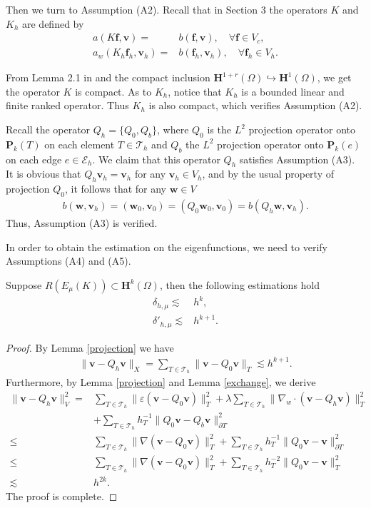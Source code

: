 \documentclass[leqno,CJK]{siamltex704}
\numberwithin{equation}{section}
\def\E{{\mathcal{E}}}
\def\T{{\mathcal{T}}}
\def\sumT{\sum_{T\in\mathcal{T}_h}}     %
\def\bw{{\mathbf{w}}}
\def\bv{{\mathbf{v}}}
\def\bh{{\mathbf{H}}}
\def\bf{{\mathbf{f}}}
\def\bP{{\mathbf{P}}}
\newcommand{\eps}{\varepsilon}
\begin{document}
Then we turn to Assumption (A2). Recall that in Section 3 the operators
$K$ and $K_h$ are defined by
\begin{align*}
	a(K\bf,\bv)=& b(\bf,\bv),\quad\forall\bf\in V_c,
	\\
	a_w(K_h\bf_h,\bv_h)=& b(\bf_h,\bv_h),\quad\forall \bf_h\in V_h.
\end{align*}

From Lemma 2.1 in \cite{Mora2020} and the compact inclusion $\bh^{1+r}(\Omega)\hookrightarrow\bh^1(\Omega)$, we get the operator $K$ is compact. As to $K_h$, notice that $K_h$ is a bounded linear and finite ranked operator. Thus $K_h$ is also compact, which verifies Assumption (A2).

Recall the operator $Q_h=\{Q_0,Q_b\}$, where $Q_0$ is the $L^2$ projection operator
onto $\bP_k(T)$ on each element $T\in\T_h$ and $Q_b$ the $L^2$ projection operator
onto $\bP_k(e)$ on each edge $e\in\E_h$. We claim that this operator $Q_h$ satisfies Assumption (A3).
It is obvious that $Q_h\bv_h=\bv_h$ for any $\bv_h\in V_h$, and by the usual property of projection $Q_0$, it follows that for any $\bw\in V$
\begin{eqnarray*}
	b(\bw,\bv_h) = (\bw_0,\bv_0) = (Q_0\bw_0,\bv_0) = b(Q_h\bw,\bv_h).
\end{eqnarray*}
Thus, Assumption (A3) is verified.

In order to obtain the estimation on the eigenfunctions, we need to verify Assumptions (A4) and (A5).
\begin{lemma}\label{delta}
	Suppose $R(E_\mu(K))\subset \bh^k(\Omega)$, then the following estimations hold
	\begin{align*}
		\delta_{h,\mu} \lesssim & h^k,
		\\
		\delta'_{h,\mu} \lesssim & h^{k+1}.
	\end{align*}
\end{lemma}
\begin{proof}
	By Lemma \ref{projection} we have
	\begin{eqnarray*}
		\|\bv-Q_h\bv\|_X = \sumT\|\bv-Q_0\bv\|_T\lesssim  h^{k+1}.
	\end{eqnarray*}	
	Furthermore, by Lemma \ref{projection} and Lemma \ref{exchange}, we derive
	\begin{align*}
		\|\bv-Q_h\bv\|_V^2 =& 
		\sumT\|\eps(\bv-Q_0\bv)\|_T^2 + \lambda\sumT\|\nabla_w\cdot (\bv-Q_h\bv)\|_T^2\\
		\quad&+ \sumT h_T^{-1}\|Q_0\bv- Q_b\bv\|_{\partial T}^2
		\\
		\le& \sumT\|\nabla(\bv-Q_0\bv)\|_T^2 + \sumT h_T^{-1}\|Q_0\bv- \bv\|_{\partial T}^2
		\\
		\le& \sumT\|\nabla(\bv-Q_0\bv)\|_T^2 + \sumT h_T^{-2}\|Q_0\bv- \bv\|_T^2
		\\
		\lesssim & h^{2k}.
	\end{align*}
	The proof is complete.
\end{proof}
\end{document}

